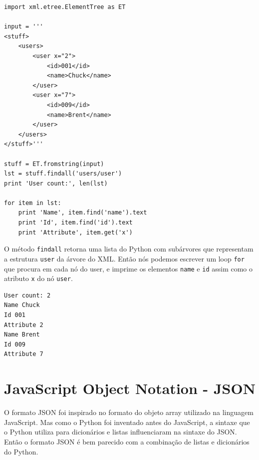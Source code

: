 \beforeverb
\begin{verbatim}
import xml.etree.ElementTree as ET

input = '''
<stuff>
    <users>
        <user x="2">
            <id>001</id>
            <name>Chuck</name>
        </user>
        <user x="7">
            <id>009</id>
            <name>Brent</name>
        </user>
    </users>
</stuff>'''

stuff = ET.fromstring(input)
lst = stuff.findall('users/user')
print 'User count:', len(lst)

for item in lst:
    print 'Name', item.find('name').text
    print 'Id', item.find('id').text
    print 'Attribute', item.get('x')
\end{verbatim}
\afterverb
%
O método {\tt findall} retorna uma lista do Python com subárvores
que representam a estrutura {\tt user} da árvore do XML. Então nós 
podemos escrever um loop {\tt for} que procura em cada nó do user,
e imprime os elementos {\tt name} e {\tt id} assim como o 
atributo {\tt x} do nó {\tt user}.

\beforeverb
\begin{verbatim}
User count: 2
Name Chuck
Id 001
Attribute 2
Name Brent
Id 009
Attribute 7
\end{verbatim}
\afterverb
%

\section{JavaScript Object Notation - JSON}

O formato JSON foi inspirado no formato do objeto array utilizado na linguagem JavaScript.
Mas como o Python foi inventado antes do JavaScript, a sintaxe que o Python utiliza
para dicionários e listas influenciaram na sintaxe do JSON. Então o formato JSON é
bem parecido com a combinação de listas e dicionários do Python.

